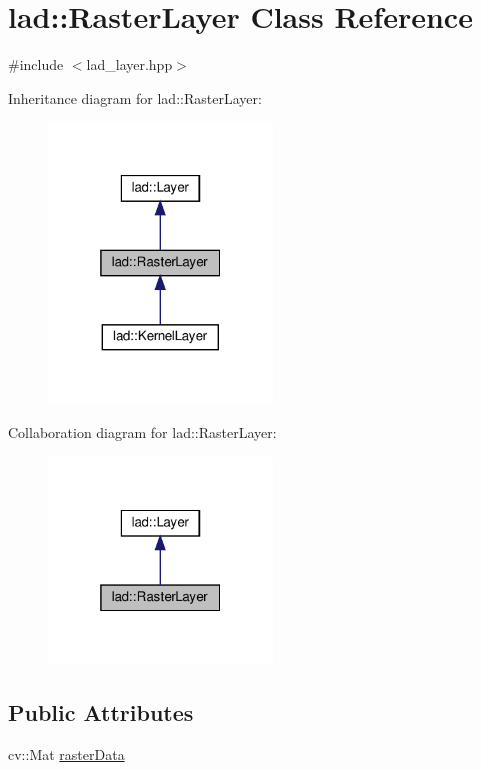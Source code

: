 \hypertarget{classlad_1_1_raster_layer}{}\section{lad\+:\+:Raster\+Layer Class Reference}
\label{classlad_1_1_raster_layer}


{\ttfamily \#include $<$lad\+\_\+layer.\+hpp$>$}



Inheritance diagram for lad\+:\+:Raster\+Layer\+:\nopagebreak
\begin{figure}[H]
\begin{center}
\leavevmode
\includegraphics[width=169pt]{classlad_1_1_raster_layer__inherit__graph}
\end{center}
\end{figure}


Collaboration diagram for lad\+:\+:Raster\+Layer\+:\nopagebreak
\begin{figure}[H]
\begin{center}
\leavevmode
\includegraphics[width=169pt]{classlad_1_1_raster_layer__coll__graph}
\end{center}
\end{figure}
\subsection*{Public Attributes}
\begin{DoxyCompactItemize}
\item 
cv\+::\+Mat \hyperlink{classlad_1_1_raster_layer_a535fc341b4589834ed018b3e24c329b3}{raster\+Data}
\end{DoxyCompactItemize}
